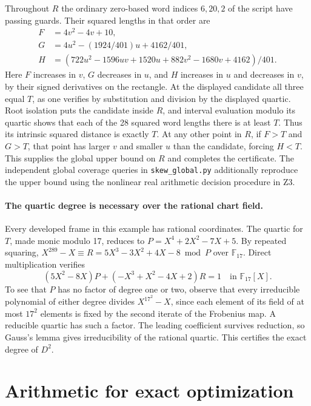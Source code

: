 \documentclass[10pt,letterpaper]{article}
\begin{document}
Throughout $R$ the ordinary zero-based word indices $6,20,2$ of the
script have passing guards. Their squared lengths in that order are
\[
\begin{aligned}
 F&=4v^2-4v+10,\\
 G&=4u^2-(1924/401)u+4162/401,\\
 H&=(722u^2-1596uv+1520u+882v^2-1680v+4162)/401.
\end{aligned}
\]
Here $F$ increases in $v$, $G$ decreases in $u$, and $H$ increases
in $u$ and decreases in $v$, by their signed derivatives on the
rectangle. At the displayed candidate all three equal $T$, as one verifies by substitution and division by the displayed quartic. Root isolation puts the candidate inside $R$, and interval
evaluation modulo its quartic shows that each of the 28 squared
word lengths there is at least $T$. Thus its intrinsic squared
distance is exactly $T$. At any other point in $R$, if $F>T$ and
$G>T$, that point has larger $v$ and smaller $u$ than the candidate,
forcing $H<T$. This supplies the global upper bound on $R$ and
completes the certificate. The independent global coverage queries in \texttt{skew\_global.py} additionally reproduce the upper bound using the nonlinear real arithmetic decision procedure in Z3.

\paragraph{The quartic degree is necessary over the rational chart field.}
Every developed frame in this example has rational coordinates. The quartic for $T$, made monic modulo 17,
reduces to $P=X^4+2X^2-7X+5$. By repeated squaring,
$X^{289}-X\equiv R=5X^3-3X^2+4X-8\bmod P$ over $\mathbb F_{17}$.
Direct multiplication verifies
\[
 (5X^2-8X)P+(-X^3+X^2-4X+2)R=1
 \quad\text{in }\mathbb F_{17}[X].
\]
To see that $P$ has no factor of degree one or two, observe that every irreducible
polynomial of either degree divides $X^{17^2}-X$, since each element
of its field of at most $17^2$ elements is fixed by the second
iterate of the Frobenius map. A reducible quartic has such a factor.
The leading coefficient survives reduction, so Gauss's lemma gives
irreducibility of the rational quartic. This certifies the exact
degree of $D^2$.

\section{Arithmetic for exact optimization}
\label{sec:algebraic-engine}
\end{document}
